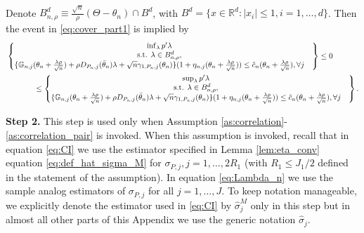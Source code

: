 \documentclass[letterpaper,11pt]{article}
\theoremstyle{myplain}
\theoremstyle{mydefinition}
\theoremstyle{myremark}
\newcommand{\R}{\mathbb{R}}
\newcommand{\larhon}{\frac{\lambda \rho }{\sqrt n}}
\numberwithin{equation}{section}
\numberwithin{figure}{section}
\begin{document}
\begin{appendices}
\begin{align}
\end{align}	 
Denote $B^d_{n,\rho}\equiv \frac{\sqrt n}{\rho }(\Theta-\theta_n)\cap B^d$, with $B^d = \{x \in \R^d:|x_i| \le 1, i=1,\dots,d\}$.
Then the event in \eqref{eq:cover_part1} is implied by
	 \begin{align}
	 	 		 &\begin{Bmatrix} \inf_{\lambda} p^\prime\lambda  &   \\ \text{s.t. } \lambda\in B^d_{n,\rho}, & \\ \{\mathbb G_{n,j}(\theta_n+\larhon)+\rho  D_{P_n,j}(\bar\theta_n)\lambda+\sqrt{n} \gamma_{1,P_n,j}(\theta_n)\}(1+\eta_{n,j}(\theta_n+\larhon))\le  \hat{c}_n(\theta_n+\larhon), \forall j  &  \end{Bmatrix} \leq 0  \notag\\
	 &\hspace{0.5in}\leq\begin{Bmatrix} \sup_{\lambda} p'\lambda  &   \\ \text{s.t. } \lambda\in B^d_{n,\rho}, & \\ \{\mathbb G_{n,j}(\theta_n+\larhon)+\rho  D_{P_n,j}(\bar\theta_n)\lambda+\sqrt{n} \gamma_{1,P_n,j}(\theta_n)\}(1+\eta_{n,j}(\theta_n+\larhon))\le  \hat{c}_n(\theta_n+\larhon), \forall j  &  \end{Bmatrix}.\label{eq:cover_part2}
	 \end{align}


\noindent \textbf{Step 2.} This step is used only when Assumption \ref{as:correlation}-\ref{as:correlation_pair} is invoked. When this assumption is invoked, recall that
in equation \eqref{eq:CI} we use the estimator specified in Lemma \ref{lem:eta_conv} equation \eqref{eq:def_hat_sigma_M} for $\sigma_{P,j},j=1,\dots,2R_1$ (with $R_1 \le J_1/2$ defined in the statement of the assumption). In equation \eqref{eq:Lambda_n} we use the sample analog estimators of $\sigma_{P,j}$ for all $j=1,\dots,J$.
To keep notation manageable, we explicitly denote the estimator used in \eqref{eq:CI} by $\hat{\sigma}^M_j$ only in this step but in almost all other parts of this Appendix we use the generic notation $\hat{\sigma}_j$. 


\end{appendices}
\end{document}
